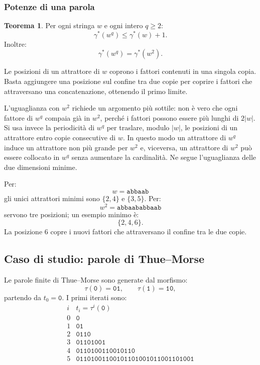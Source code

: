 \documentclass{article}
\theoremstyle{definition}
\newtheorem{theorem}{Teorema}[section] %
\numberwithin{equation}{section}
\begin{document}
\subsubsection{Potenze di una parola}
\begin{theorem}\label{theorem_attractor_power}
    Per ogni stringa $w$ e ogni intero $q\geq 2$:
    \[
        \gamma^*(w^q)\leq\gamma^*(w)+1.
    \]
    Inoltre:
    \[
        \gamma^*(w^q)=\gamma^*(w^2).
    \]
\end{theorem}

Le posizioni di un attrattore di $w$ coprono i fattori contenuti in una singola
copia. Basta aggiungere una posizione sul confine tra due copie per coprire i
fattori che attraversano una concatenazione, ottenendo il primo limite.

L'uguaglianza con $w^2$ richiede un argomento più sottile: non è vero che ogni
fattore di $w^q$ compaia già in $w^2$, perché i fattori possono essere più
lunghi di $2|w|$. Si usa invece la periodicità di $w^q$ per traslare, modulo
$|w|$, le posizioni di un attrattore entro copie consecutive di $w$. In questo
modo un attrattore di $w^q$ induce un attrattore non più grande per $w^2$ e,
viceversa, un attrattore di $w^2$ può essere collocato in $w^q$ senza aumentare
la cardinalità. Ne segue l'uguaglianza delle due dimensioni minime.

Per:
\[
    w=\texttt{abbaab}
\]
gli unici attrattori minimi sono $\{2,4\}$ e $\{3,5\}$. Per:
\[
    w^2=\texttt{abbaababbaab}
\]
servono tre posizioni; un esempio minimo è:
\[
    \{2,4,6\}.
\]
La posizione $6$ copre i nuovi fattori che attraversano il confine tra le due
copie.

\subsection{Caso di studio: parole di Thue--Morse}
Le parole finite di Thue--Morse sono generate dal morfismo:
\[
    \tau(\texttt{0})=\texttt{01},
    \qquad
    \tau(\texttt{1})=\texttt{10},
\]
partendo da $t_0=\texttt{0}$. I primi iterati sono:
\[
    \begin{array}{c|l}
        i & t_i=\tau^i(\texttt{0})                    \\ \hline
        0 & \texttt{0}                                \\
        1 & \texttt{01}                               \\
        2 & \texttt{0110}                             \\
        3 & \texttt{01101001}                         \\
        4 & \texttt{0110100110010110}                 \\
        5 & \texttt{01101001100101101001011001101001}
    \end{array}
\]
\end{document}
